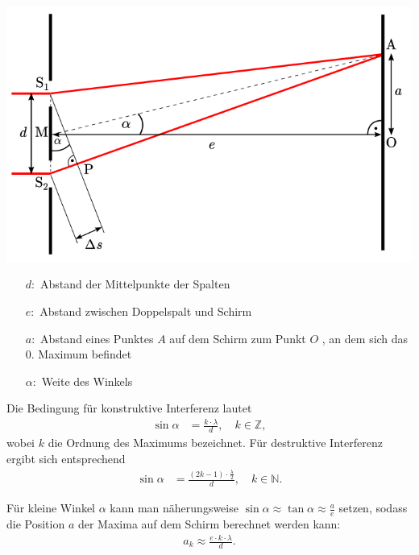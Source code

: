 \documentclass[11pt,a4paper,oneside]{article}
\begin{document}
	
	\begin{minipage}[t]{0.45\textwidth}
		\vspace{0mm}
		\includegraphics[width=\textwidth]{Doppelspalt_Einstiegsaufgaben_Bild.png}
	\end{minipage}%
	\hfill
	\begin{minipage}[t]{0.45\textwidth}
		\vspace{0pt} %
		\begin{itemize}
			\item [$d:$] Abstand der Mittelpunkte der Spalten 
			\item [$e:$] Abstand zwischen Doppelspalt und Schirm 
			\item [$a:$] Abstand eines Punktes $A$ auf dem Schirm zum Punkt $O$ , an dem sich das 0. Maximum befindet
			\item [$\alpha:$] Weite des Winkels 
		\end{itemize}
	\end{minipage}

	Die Bedingung für konstruktive Interferenz lautet
	\begin{align*}
		\sin \alpha &= \frac{k \cdot \lambda}{d}, \quad k \in \mathbb{Z},
	\end{align*}
	wobei $k$ die Ordnung des Maximums bezeichnet. Für destruktive Interferenz ergibt sich entsprechend
	\begin{align*}
		\sin \alpha &= \frac{(2k - 1)\cdot \frac{\lambda}{2}}{d}, \quad k \in \mathbb{N}.
	\end{align*}
	
	Für kleine Winkel $\alpha$ kann man näherungsweise $\sin \alpha \approx \tan \alpha \approx \frac{a}{e}$ setzen, sodass die Position $a$ der Maxima auf dem Schirm berechnet werden kann:
	\begin{align*}
		a_k \approx \frac{e \cdot k \cdot \lambda}{d}.
	\end{align*}
	
\end{document}
